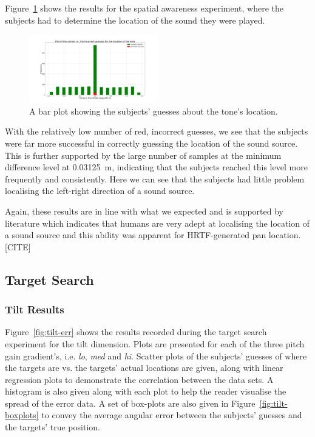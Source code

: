 \documentclass[format=sigconf, review=true, screen=true, anonymous=true]{acmart}
\begin{document}
Figure~\ref{fig:location-guesses} shows the results for the spatial awareness experiment, where the subjects had to determine the location of the sound they were played. 

\begin{figure}
  \centering
  \includegraphics[width=0.5\textwidth]{figures/location_guesses.png}
  \caption{A bar plot showing the subjects' guesses about the tone's location.}
  \label{fig:location-guesses}
\end{figure}

With the relatively low number of red, incorrect guesses, we see that the subjects were far more successful in correctly guessing the location of the sound source. This is further supported by the large number of samples at the minimum difference level at \SI{0.03125}{\m}, indicating that the subjects reached this level more frequently and consistently. Here we can see that the subjects had little problem localising the left-right direction of a sound source. 

Again, these results are in line with what we expected and is supported by literature which indicates that humans are very adept at localising the location of a sound source and this ability was apparent for HRTF-generated pan location. [CITE]

\subsection{Target Search}

\subsubsection{Tilt Results}

Figure~\ref{fig:tilt-err} shows the results recorded during the target search experiment for the tilt dimension. Plots are presented for each of the three pitch gain gradient's, i.e. \emph{lo}, \emph{med} and \emph{hi}. Scatter plots of the subjects' guesses of where the targets are vs. the targets' actual locations are given, along with linear regression plots to demonstrate the correlation between the data sets. A histogram is also given along with each plot to help the reader visualise the spread of the error data. A set of box-plots are also given in Figure~\ref{fig:tilt-boxplots} to convey the average angular error between the subjects' guesses and the targets' true position.
\end{document}
